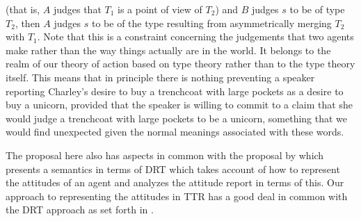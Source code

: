 (that is, $A$ judges that $T_1$ is a point of view of $T_2$) and $B$
judges $s$ to be of type $T_2$, then $A$ judges $s$ to be of the type
resulting from asymmetrically merging $T_2$ with $T_1$.  Note that
this is a constraint concerning the judgements that two agents make
rather than the way things actually are in the world.  It belongs to
the realm of our theory of action based on type theory rather than to
the type theory itself.  This means that in principle there is nothing
preventing a speaker reporting Charley's desire to buy a trenchcoat
with large pockets as a desire to buy a unicorn, provided that the
speaker is willing to commit to a claim that she would judge a
trenchcoat with large pockets to be a unicorn, something that we would
find unexpected given the normal meanings associated with these words.   

The proposal here also has aspects in common with the proposal by
\cite{Prossms} which presents a semantics in terms of DRT which takes
account of how to represent the attitudes of an agent and analyzes 
the attitude report in terms of this.  Our approach to representing
the attitudes in TTR has a good deal in common with the DRT approach
as set forth in \cite{Kamp1990,KampGenabithReyle2011}.

